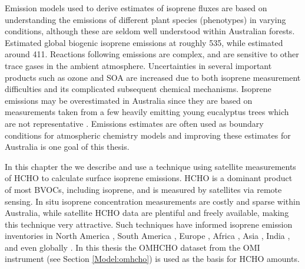   Emission models used to derive estimates of isoprene fluxes are based on understanding the emissions of different plant species (phenotypes) in varying conditions, although these are seldom well understood within Australian forests.
  \textcite{Guenther2012} Estimated global biogenic isoprene emissions at roughly 535\tgpyr, while \textcite{Sindelarova2014} estimated around 411\tgpyr.
  Reactions following emissions are complex, and are sensitive to other trace gases in the ambient atmosphere.
  Uncertainties in several important products such as ozone and SOA are increased due to both isoprene measurement difficulties and its complicated subsequent chemical mechanisms.
  Isoprene emissions may be overestimated in Australia since they are based on measurements taken from a few heavily emitting young eucalyptus trees which are not representative \parencite{Winters2009, FortemsCheiney2012,}.
  Emissions estimates are often used as boundary conditions for atmospheric chemistry models and improving these estimates for Australia is one goal of this thesis.
  
  
  In this chapter the we describe and use a technique using satellite measurements of HCHO to calculate surface isoprene emissions.
  HCHO is a dominant product of most BVOCs, including isoprene, and is measured by satellites via remote sensing.
  In situ isoprene concentration measurements are costly and sparse within Australia, while satellite HCHO data are plentiful and freely available, making this technique very attractive.
  Such techniques have informed isoprene emission inventories in North America \parencite{Abbot2003,Palmer2003,Palmer2006,Millet2006,Millet2008}, South America \parencite{Barkley2013}, Europe \parencite{Dufour2009,Curci2010}, Africa \parencite{Marais2012}, Asia \parencite{Fu2007,Stavrakou2014}, India \parencite{Surl2018}, and even globally \parencite{Shim2005,FortemsCheiney2012,Bauwens2016}.
  In this thesis the OMHCHO dataset from the OMI instrument (see Section \ref{Model:omhcho}) is used as the basis for HCHO amounts.
  
